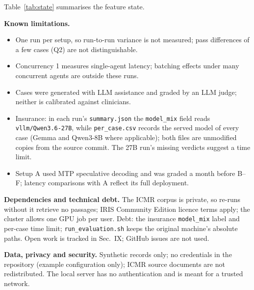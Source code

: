 \documentclass[conference]{IEEEtran}
\begin{document}
Table~\ref{tab:state} summarises the feature state.

\textbf{Known limitations.}
\begin{itemize}
\item One run per setup, so run-to-run variance is not measured; pass differences of a few cases (Q2) are not distinguishable.
\item Concurrency 1 measures single-agent latency; batching effects under many concurrent agents are outside these runs.
\item Cases were generated with LLM assistance and graded by an LLM judge; neither is calibrated against clinicians.
\item Insurance: in each run's \texttt{summary.json} the \texttt{model\_mix} field reads \texttt{vllm/Qwen3.6-27B}, while \texttt{per\_case.csv} records the served model of every case (Gemma and Qwen3-8B where applicable); both files are unmodified copies from the source commit. The 27B run's missing verdicts suggest a time limit.
\item Setup A used MTP speculative decoding and was graded a month before B--F; latency comparisons with A reflect its full deployment.
\end{itemize}

\textbf{Dependencies and technical debt.} The ICMR corpus is private, so re-runs without it retrieve no passages; IRIS Community Edition licence terms apply; the cluster allows one GPU job per user. Debt: the insurance \texttt{model\_mix} label and per-case time limit; \texttt{run\_evaluation.sh} keeps the original machine's absolute paths. Open work is tracked in Sec.~IX; GitHub issues are not used.

\textbf{Data, privacy and security.} Synthetic records only; no credentials in the repository (example configuration only); ICMR source documents are not redistributed. The local server has no authentication and is meant for a trusted network.
\end{document}
